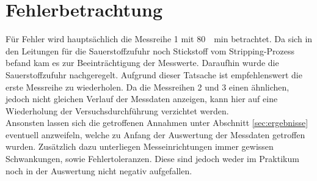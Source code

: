 \section{Fehlerbetrachtung}
\label{sec:fehler}
Für Fehler wird hauptsächlich die Messreihe 1 mit \SI{80}{\per\minute} betrachtet. Da sich in den Leitungen für die Sauerstoffzufuhr noch Stickstoff vom Stripping-Prozess befand kam es zur Beeinträchtigung der Messwerte. Daraufhin wurde die Sauerstoffzufuhr nachgeregelt.  Aufgrund dieser Tatsache ist empfehlenswert die erste Messreihe zu wiederholen.
Da die Messreihen 2 und 3 einen ähnlichen, jedoch nicht gleichen Verlauf der Messdaten anzeigen, kann hier auf eine Wiederholung der Versuchsdurchführung verzichtet werden.\\

Ansonsten lassen sich die getroffenen Annahmen unter Abschnitt \ref{sec:ergebnisse} eventuell anzweifeln, welche zu Anfang der Auswertung der Messdaten getroffen wurden. Zusätzlich dazu unterliegen Messeinrichtungen immer gewissen Schwankungen, sowie Fehlertoleranzen. Diese sind jedoch weder im Praktikum noch in der Auswertung nicht negativ aufgefallen.
